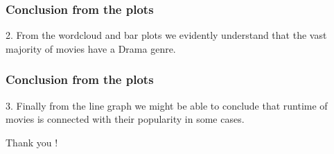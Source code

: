 \documentclass{beamer}
\begin{document}
\begin{frame}
\frametitle{Conclusion from the plots}

2. From the wordcloud and bar plots we evidently understand that the vast majority of movies
have a Drama genre.
\end{frame}

\begin{frame}
\frametitle{Conclusion from the plots}

3. Finally from the line graph we might be able to conclude that runtime of movies is connected with their popularity in some cases. 
\end{frame}

\begin{frame}
	\centering
	Thank you !
\end{frame}
\end{document}
